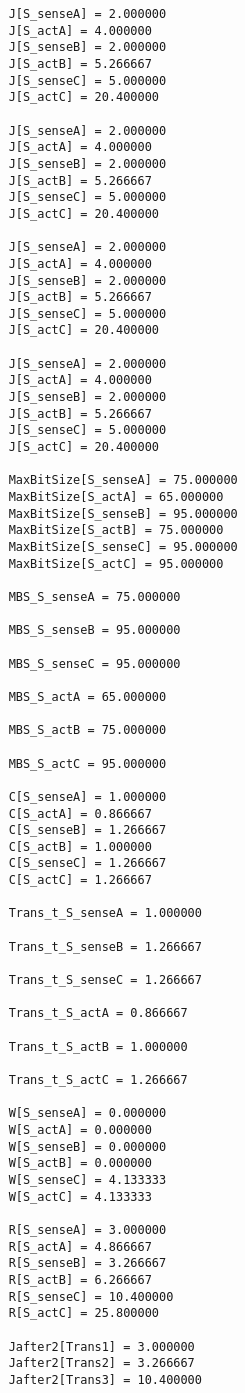 \begin{lstlisting}
    J[S_senseA] = 2.000000
    J[S_actA] = 4.000000
    J[S_senseB] = 2.000000
    J[S_actB] = 5.266667
    J[S_senseC] = 5.000000
    J[S_actC] = 20.400000
    
    J[S_senseA] = 2.000000
    J[S_actA] = 4.000000
    J[S_senseB] = 2.000000
    J[S_actB] = 5.266667
    J[S_senseC] = 5.000000
    J[S_actC] = 20.400000
    
    J[S_senseA] = 2.000000
    J[S_actA] = 4.000000
    J[S_senseB] = 2.000000
    J[S_actB] = 5.266667
    J[S_senseC] = 5.000000
    J[S_actC] = 20.400000
    
    J[S_senseA] = 2.000000
    J[S_actA] = 4.000000
    J[S_senseB] = 2.000000
    J[S_actB] = 5.266667
    J[S_senseC] = 5.000000
    J[S_actC] = 20.400000
    
    MaxBitSize[S_senseA] = 75.000000
    MaxBitSize[S_actA] = 65.000000
    MaxBitSize[S_senseB] = 95.000000
    MaxBitSize[S_actB] = 75.000000
    MaxBitSize[S_senseC] = 95.000000
    MaxBitSize[S_actC] = 95.000000
    
    MBS_S_senseA = 75.000000
    
    MBS_S_senseB = 95.000000
    
    MBS_S_senseC = 95.000000
    
    MBS_S_actA = 65.000000
    
    MBS_S_actB = 75.000000
    
    MBS_S_actC = 95.000000
    
    C[S_senseA] = 1.000000
    C[S_actA] = 0.866667
    C[S_senseB] = 1.266667
    C[S_actB] = 1.000000
    C[S_senseC] = 1.266667
    C[S_actC] = 1.266667
    
    Trans_t_S_senseA = 1.000000
    
    Trans_t_S_senseB = 1.266667
    
    Trans_t_S_senseC = 1.266667
    
    Trans_t_S_actA = 0.866667
    
    Trans_t_S_actB = 1.000000
    
    Trans_t_S_actC = 1.266667
    
    W[S_senseA] = 0.000000
    W[S_actA] = 0.000000
    W[S_senseB] = 0.000000
    W[S_actB] = 0.000000
    W[S_senseC] = 4.133333
    W[S_actC] = 4.133333
    
    R[S_senseA] = 3.000000
    R[S_actA] = 4.866667
    R[S_senseB] = 3.266667
    R[S_actB] = 6.266667
    R[S_senseC] = 10.400000
    R[S_actC] = 25.800000
    
    Jafter2[Trans1] = 3.000000
    Jafter2[Trans2] = 3.266667
    Jafter2[Trans3] = 10.400000
    

\end{lstlisting}
